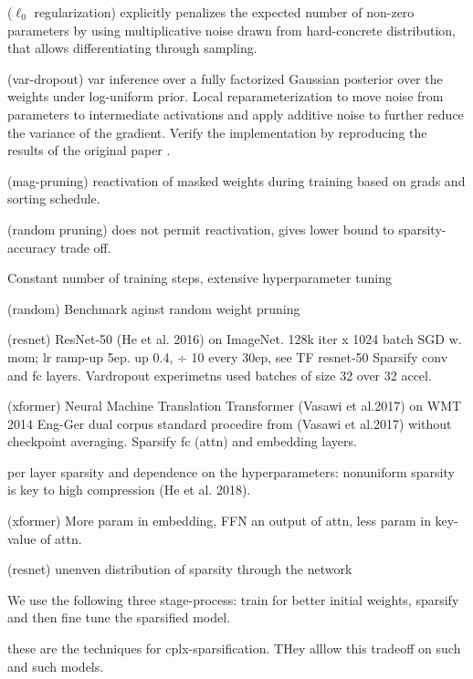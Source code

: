 ($\ell_0$ regularization) explicitly penalizes the expected number of non-zero parameters
by using multiplicative noise drawn from hard-concrete distribution, that allows differentiating
through sampling.

(var-dropout) var inference over a fully factorized Gaussian posterior over the weights under
log-uniform prior. Local reparameterization to move noise from parameters to intermediate activations
and apply additive noise to further reduce the variance of the gradient. Verify the implementation
by reproducing the results of the original paper \citep{molchanovetal2017}.

(mag-pruning) reactivation of masked weights during training based on grads and sorting schedule.

(random pruning) does not permit reactivation, gives lower bound to sparsity-accuracy trade off.

Constant number of training steps, extensive hyperparameter tuning

(random) Benchmark aginst random weight pruning

(resnet) ResNet-50 (He et al. 2016) on ImageNet. 128k iter x 1024 batch 
SGD w. mom; lr ramp-up 5ep. up 0.4, ÷ 10 every 30ep, see TF resnet-50
Sparsify conv and fc layers. Vardropout experimetns used batches of size 32 over 32 accel.

(xformer) Neural Machine Translation Transformer (Vasawi et al.2017) on WMT 2014 Eng-Ger dual corpus
standard procedire from (Vasawi et al.2017) without checkpoint averaging. Sparsify fc (attn) and
embedding layers.

per layer sparsity and dependence on the hyperparameters: nonuniform sparsity is key to
high compression (He et al. 2018).

(xformer) More param in embedding, FFN an output of attn, less param in key-value of attn.

(resnet) unenven distribution of sparsity through the network

We use the following three stage-process: train for better initial weights, sparsify
and then fine tune the sparsified model.

these are the techniques for cplx-sparsification. THey alllow this tradeoff on such and
such models.
